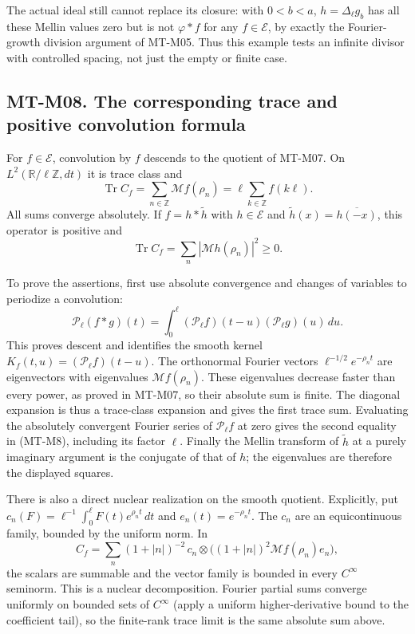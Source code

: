\documentclass[11pt,a4paper]{article}
\begin{document}
The actual ideal still cannot replace its closure: with $0<b<a$,
$h=\Delta_\ell g_b$ has all these Mellin values zero but is not
$\varphi*f$ for any $f\in\mathcal E$, by exactly the Fourier-growth
division argument of MT-M05. Thus this example tests an infinite
divisor with controlled spacing, not just the empty or finite case.

\subsection*{MT-M08. The corresponding trace and positive convolution formula}
For $f\in\mathcal E$, convolution by $f$ descends to the quotient of
MT-M07. On $L^2(\mathbb R/\ell\mathbb Z,dt)$ it is trace class and
\[
 \operatorname{Tr}C_f
   =\sum_{n\in\mathbb Z}\mathcal Mf(\rho_n)
   =\ell\sum_{k\in\mathbb Z}f(k\ell).                 \tag{MT-M8}
\]
All sums converge absolutely. If
$f=h*\widetilde h$ with $h\in\mathcal E$ and
$\widetilde h(x)=\overline{h(-x)}$, this operator is positive and
\[
                  \operatorname{Tr}C_f
                   =\sum_n|\mathcal Mh(\rho_n)|^2\ge0.
\]

To prove the assertions, first use absolute convergence and changes of
variables to periodize a convolution:
\[
 \mathcal P_\ell(f*g)(t)
  =\int_0^\ell(\mathcal P_\ell f)(t-u)
                     (\mathcal P_\ell g)(u)\,du.
\]
This proves descent and identifies the smooth kernel
$K_f(t,u)=(\mathcal P_\ell f)(t-u)$.
The orthonormal Fourier vectors
$\ell^{-1/2}e^{-\rho_n t}$ are eigenvectors with eigenvalues
$\mathcal Mf(\rho_n)$. These eigenvalues decrease faster than every
power, as proved in MT-M07, so their absolute sum is finite.
The diagonal expansion is thus a trace-class expansion and gives
the first trace sum. Evaluating the absolutely convergent Fourier
series of $\mathcal P_\ell f$ at zero gives the second equality
in (MT-M8), including its factor $\ell$. Finally the Mellin transform
of $\widetilde h$ at a purely imaginary argument is the conjugate
of that of $h$; the eigenvalues are therefore the displayed squares.

There is also a direct nuclear realization on the smooth quotient.
Explicitly, put $c_n(F)=\ell^{-1}\int_0^\ell F(t)e^{\rho_nt}\,dt$
and $e_n(t)=e^{-\rho_nt}$. The $c_n$ are an equicontinuous family,
bounded by the uniform norm. In
\[
 C_f=\sum_n(1+|n|)^{-2}\,
       c_n\otimes\bigl((1+|n|)^2\mathcal Mf(\rho_n)e_n\bigr),
\]
the scalars are summable and the vector family is bounded in every
$C^\infty$ seminorm. This is a nuclear decomposition. Fourier partial
sums converge uniformly on bounded sets of $C^\infty$ (apply a
uniform higher-derivative bound to the coefficient tail), so the
finite-rank trace limit is the same absolute sum above.
\end{document}
